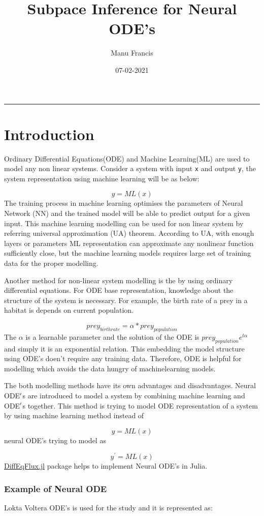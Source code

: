 \documentclass[12pt,a4paper]{article}
\title{ Subpace Inference for Neural ODE's }
\author{ Manu Francis }
\date{ 07-02-2021 }
\begin{document}
\maketitle

\rule{\textwidth}{1pt}
\section{Introduction}
Ordinary Differential Equations(ODE) and Machine Learning(ML) are used to model any non linear systems. Consider a system with input \texttt{x} and output \texttt{y}, the system representation using machine learning will be as below:

\[
y = ML(x)
\]
The training process in machine learning optimises the parameters of Neural Network (NN) and the trained model will be able to predict output for a given input. This machine learning modelling can be used for non linear system by referring universal approximation (UA) theorem. According to UA, with enough layers or parameters ML representation can approximate any nonlinear function sufficiently close, but the machine learning models requires large set of training data for the proper modelling.

Another method for non-linear system modelling is the by using ordinary differential equations.  For ODE base representation, knowledge about the structure of the system is necessary. For example, the birth rate of a prey in a habitat is depends on current population.

\[
  prey_{birthrate} = \alpha*prey_{population}
\]
The $\alpha$ is a learnable parameter and the solution of the ODE is $prey_{population}e^{t\alpha}$ and simply it is an exponential relation. This embedding the model structure using ODE's doen't require any training data. Therefore, ODE is helpful for modelling  which  avoids the  data hungry of machinelearning models. 

The both modelling methods have its own advantages and disadvantages. Neural ODE\ensuremath{\rq}s are introduced to model a system by combining machine learning and ODE\ensuremath{\rq}s together. This method is trying to model ODE representation of a system by using machine learning method instead of 

\[
y = ML(x)
\]
neural ODE's trying to model as

\[
y^{'} = ML(x)
\]
\href{https://github.com/SciML/DiffEqFlux.jl}{DiffEqFlux.jl} package helps to implement Neural ODE's in Julia.

\subsubsection{Example of Neural ODE}
Lokta Voltera ODE's is used for the study and it is represented as:
\end{document}
